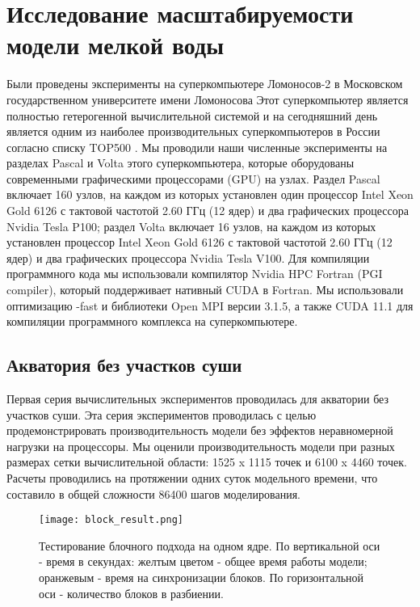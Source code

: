 \chapter{Исследование масштабируемости модели мелкой воды}\label{ch:ch3}

Были проведены эксперименты на суперкомпьютере Ломоносов-2 в Московском государственном университете имени Ломоносова %
Этот суперкомпьютер является полностью гетерогенной вычислительной системой и на сегодняшний день является одним из наиболее производительных суперкомпьютеров в России согласно списку TOP500 \cite{TOP500}.
Мы проводили наши численные эксперименты на разделах Pascal и Volta этого суперкомпьютера, которые оборудованы современными графическими процессорами (GPU) на узлах. Раздел Pascal включает 160 узлов, на каждом из которых установлен один процессор Intel Xeon Gold 6126 с тактовой частотой 2.60 ГГц (12 ядер) и два графических процессора Nvidia Tesla P100; раздел Volta включает 16 узлов, на каждом из которых  установлен процессор Intel Xeon Gold 6126 с тактовой частотой 2.60 ГГц (12 ядер) и два графических процессора Nvidia Tesla V100. 
Для компиляции программного кода мы использовали компилятор Nvidia HPC Fortran (PGI compiler), который поддерживает нативный CUDA в Fortran.
Мы использовали оптимизацию -fast и библиотеки Open MPI версии 3.1.5, а также CUDA 11.1 для компиляции программного комплекса на суперкомпьютере.

\section{Акватория без участков суши}\label{sec:ch3/sec1}

Первая серия вычислительных экспериментов проводилась для акватории без участков суши. Эта серия экспериментов проводилась с целью продемонстрировать производительность модели без эффектов неравномерной нагрузки на процессоры.
Мы оценили производительность модели при разных размерах сетки вычислительной области: 1525 x 1115 точек и 6100 x 4460 точек.
Расчеты проводились на протяжении одних суток модельного времени, что составило в общей сложности 86400 шагов моделирования.

\begin{figure}[htb!]
    \center
    \texttt{[image: block\_result.png]}
    \caption{Тестирование блочного подхода на одном ядре. По вертикальной оси - время в секундах: желтым цветом - общее время работы модели; оранжевым - время на синхронизации блоков. По горизонтальной оси - количество блоков в разбиении.}
    \label{fig:block_res}
\end{figure}
    
